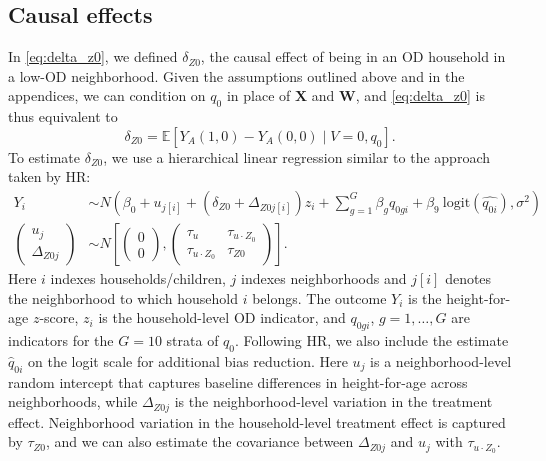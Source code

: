 \documentclass[12pt,a4paper,titlepage]{article}
\begin{document}
\subsection{Causal effects}
In \eqref{eq:delta_z0}, we defined $\delta_{Z0}$, the causal effect of being in an OD household in a low-OD neighborhood. Given the assumptions outlined above and in the appendices, we can condition on $q_0$ in place of $\mathbf{X}$ and $\mathbf{W}$, and \eqref{eq:delta_z0} is thus equivalent to
\[
	\delta_{Z0} = \mathbb{E}[Y_A(1,0) - Y_A(0,0) \mid V=0, q_0].
\]
To estimate $\delta_{Z0}$, we use a hierarchical linear regression similar to the approach taken by HR:
\begin{align*}
	Y_i &\sim N \left( \beta_0 + u_{j[i]} + (\delta_{Z0} + \Delta_{Z0j[i]})z_i + \sum_{g=1}^G \beta_g q_{0gi} + \beta_9 ~ \text{logit}(\widehat{q_{0i}}), \sigma^2 \right) \\
	\begin{pmatrix}
	  u_j \\
	  \Delta_{Z0j}
	\end{pmatrix} &\sim N \left[ \begin{pmatrix}
         	                       0 \\
         	                       0
	                             \end{pmatrix}, \begin{pmatrix}
	                                              \tau_u & \tau_{u \cdot Z_0} \\
	                                              \tau_{u \cdot Z_0} & \tau_{Z0}
	                                            \end{pmatrix} \right].
\end{align*}
Here $i$ indexes households/children, $j$ indexes neighborhoods and $j[i]$ denotes the neighborhood to which household $i$ belongs. The outcome $Y_i$ is the height-for-age $z$-score, $z_i$ is the household-level OD indicator, and $q_{0gi}$, $g = 1, \ldots, G$ are indicators for the $G=10$ strata of $q_0$. Following HR, we also include the estimate $\widehat{q}_{0i}$ on the logit scale for additional bias reduction. Here $u_j$ is a neighborhood-level random intercept that captures baseline differences in height-for-age across neighborhoods, while $\Delta_{Z0j}$ is the neighborhood-level variation in the treatment effect. Neighborhood variation in the household-level treatment effect is captured by $\tau_{Z0}$, and we can also estimate the covariance between $\Delta_{Z0j}$ and $u_j$ with $\tau_{u \cdot Z_0}$.
\end{document}
